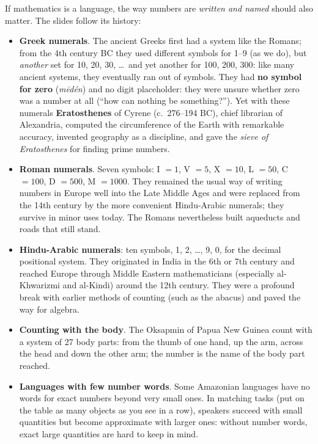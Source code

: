 If mathematics is a language, the way numbers are \emph{written and named} should also
matter. The slides follow its history:
\begin{itemize}
  \item \textbf{Greek numerals}. The ancient Greeks first had a system like the Romans;
        from the 4th century BC they used different symbols for 1--9 (as we do), but
        \emph{another} set for 10, 20, 30, \ldots\ and yet another for 100, 200, 300:
        like many ancient systems, they eventually ran out of symbols. They had \textbf{no
        symbol for zero} (\emph{mēdén}) and no digit placeholder: they were unsure
        whether zero was a number at all (``how can nothing be something?''). Yet with
        these numerals \textbf{Eratosthenes} of Cyrene (c.\ 276--194 BC), chief
        librarian of Alexandria, computed the circumference of the Earth with remarkable
        accuracy, invented geography as a discipline, and gave the \emph{sieve of
        Eratosthenes} for finding prime numbers.
  \item \textbf{Roman numerals}. Seven symbols: I $=1$, V $=5$, X $=10$, L $=50$, C
        $=100$, D $=500$, M $=1000$. They remained the usual way of writing numbers in
        Europe well into the Late Middle Ages and were replaced from the 14th century by
        the more convenient Hindu-Arabic numerals; they survive in minor uses today. The
        Romans nevertheless built aqueducts and roads that still stand.
  \item \textbf{Hindu-Arabic numerals}: ten symbols, 1, 2, \ldots, 9, 0, for the
        decimal positional system. They originated in India in the 6th or 7th century
        and reached Europe through Middle Eastern mathematicians (especially
        al-Khwarizmi and al-Kindi) around the 12th century. They were a profound break
        with earlier methods of counting (such as the abacus) and paved the way for
        algebra.
  \item \textbf{Counting with the body}. The Oksapmin of Papua New Guinea count with a
        system of 27 body parts: from the thumb of one hand, up the arm, across the head
        and down the other arm; the number is the name of the body part reached.
  \item \textbf{Languages with few number words}. Some Amazonian languages have no words
        for exact numbers beyond very small ones. In matching tasks (put on the table as
        many objects as you see in a row), speakers succeed with small quantities but
        become approximate with larger ones: without number words, exact large
        quantities are hard to keep in mind.
\end{itemize}

